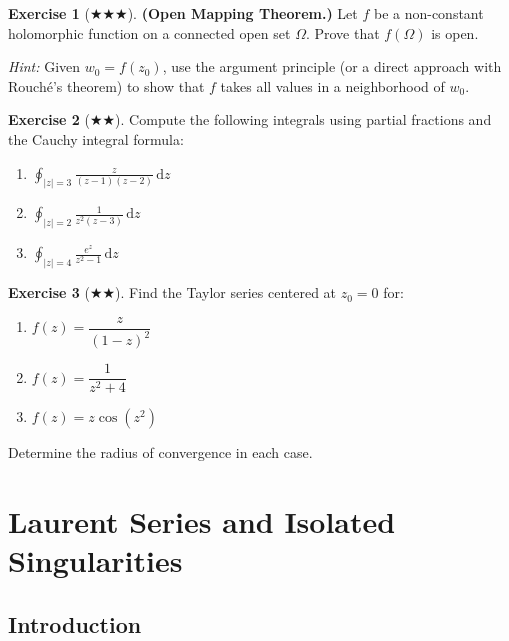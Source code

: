 \documentclass[12pt,a4paper,openany]{book}
\theoremstyle{definition}
\newtheorem{exercise}{Exercise}[chapter]
\theoremstyle{plain}
\theoremstyle{remark}
\newcommand{\dd}{\mathrm{d}}
\newcommand{\abs}[1]{\left|#1\right|}
\begin{document}
\begin{exercise}[$\bigstar\!\bigstar\!\bigstar$]\label{exo:open-mapping}
\textbf{(Open Mapping Theorem.)}
Let $f$ be a non-constant holomorphic function on a connected open set $\Omega$.
Prove that $f(\Omega)$ is open.

\textit{Hint:} Given $w_0=f(z_0)$, use the argument principle (or a direct
approach with Rouch\'e's theorem) to show that $f$ takes all values in a
neighborhood of $w_0$.
\end{exercise}

\begin{exercise}[$\bigstar\!\bigstar$]\label{exo:cauchy-formula-partial-fractions}
Compute the following integrals using partial fractions and the Cauchy integral
formula:
\begin{enumerate}[label=(\alph*)]
  \item $\displaystyle\oint_{\abs{z}=3}\frac{z}{(z-1)(z-2)}\,\dd z$
  \item $\displaystyle\oint_{\abs{z}=2}\frac{1}{z^2(z-3)}\,\dd z$
  \item $\displaystyle\oint_{\abs{z}=4}\frac{e^z}{z^2-1}\,\dd z$
\end{enumerate}
\end{exercise}

\begin{exercise}[$\bigstar\!\bigstar$]\label{exo:taylor-computation}
Find the Taylor series centered at $z_0=0$ for:
\begin{enumerate}[label=(\alph*)]
  \item $f(z)=\dfrac{z}{(1-z)^2}$
  \item $f(z)=\dfrac{1}{z^2+4}$
  \item $f(z)=z\cos(z^2)$
\end{enumerate}
Determine the radius of convergence in each case.
\end{exercise}


\chapter{Laurent Series and Isolated Singularities}
\label{chap:laurent}

\section*{Introduction}
\end{document}
